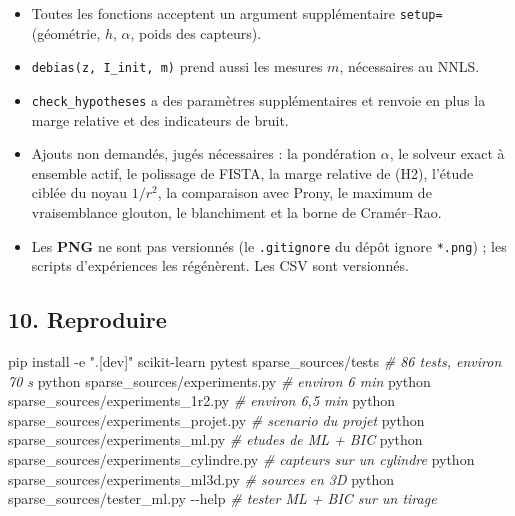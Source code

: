\documentclass[
  french,
]{article}
\newenvironment{Shaded}{}{}
\newcommand{\AttributeTok}[1]{\textcolor[rgb]{0.49,0.56,0.16}{#1}}
\newcommand{\CommentTok}[1]{\textcolor[rgb]{0.38,0.63,0.69}{\textit{#1}}}
\newcommand{\ExtensionTok}[1]{#1}
\newcommand{\NormalTok}[1]{#1}
\newcommand{\StringTok}[1]{\textcolor[rgb]{0.25,0.44,0.63}{#1}}
\providecommand{\tightlist}{%
  \setlength{\itemsep}{0pt}\setlength{\parskip}{0pt}}
\begin{document}
\begin{itemize}
\tightlist
\item
  Toutes les fonctions acceptent un argument supplémentaire
  \texttt{setup=} (géométrie, \(h\), \(\alpha\), poids des capteurs).
\item
  \texttt{debias(z,\ I\_init,\ m)} prend aussi les mesures \(m\),
  nécessaires au NNLS.
\item
  \texttt{check\_hypotheses} a des paramètres supplémentaires et renvoie
  en plus la marge relative et des indicateurs de bruit.
\item
  Ajouts non demandés, jugés nécessaires : la pondération \(\alpha\), le
  solveur exact à ensemble actif, le polissage de FISTA, la marge
  relative de (H2), l'étude ciblée du noyau \(1/r^2\), la comparaison
  avec Prony, le maximum de vraisemblance glouton, le blanchiment et la
  borne de Cramér--Rao.
\item
  Les \textbf{PNG} ne sont pas versionnés (le \texttt{.gitignore} du
  dépôt ignore \texttt{*.png}) ; les scripts d'expériences les
  régénèrent. Les CSV sont versionnés.
\end{itemize}

\subsection{10. Reproduire}\label{reproduire}

\begin{Shaded}
\begin{Highlighting}[]
\ExtensionTok{pip}\NormalTok{ install }\AttributeTok{{-}e} \StringTok{".[dev]"}\NormalTok{ scikit{-}learn}
\ExtensionTok{pytest}\NormalTok{ sparse\_sources/tests                   }\CommentTok{\# 86 tests, environ 70 s}
\ExtensionTok{python}\NormalTok{ sparse\_sources/experiments.py          }\CommentTok{\# environ 6 min}
\ExtensionTok{python}\NormalTok{ sparse\_sources/experiments\_1r2.py      }\CommentTok{\# environ 6,5 min}
\ExtensionTok{python}\NormalTok{ sparse\_sources/experiments\_projet.py   }\CommentTok{\# scenario du projet}
\ExtensionTok{python}\NormalTok{ sparse\_sources/experiments\_ml.py       }\CommentTok{\# etudes de ML + BIC}
\ExtensionTok{python}\NormalTok{ sparse\_sources/experiments\_cylindre.py }\CommentTok{\# capteurs sur un cylindre}
\ExtensionTok{python}\NormalTok{ sparse\_sources/experiments\_ml3d.py     }\CommentTok{\# sources en 3D}
\ExtensionTok{python}\NormalTok{ sparse\_sources/tester\_ml.py }\AttributeTok{{-}{-}help}     \CommentTok{\# tester ML + BIC sur un tirage}
\end{Highlighting}
\end{Shaded}
\end{document}
